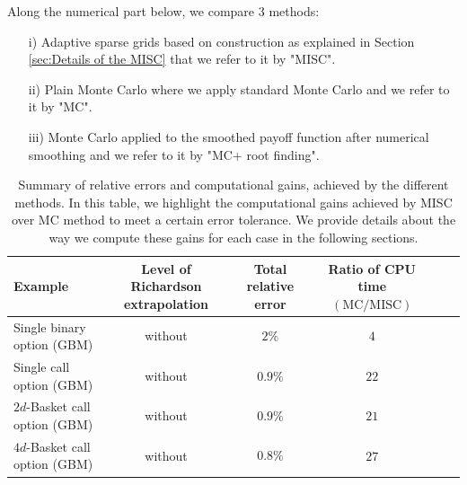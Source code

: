 Along the numerical part below, we compare $3$ methods:
\begin{enumerate}
\item[i)] Adaptive sparse grids based on construction as explained in Section \ref{sec:Details of the MISC} that we refer to it by "MISC".
\item[ii)] Plain Monte Carlo where we apply standard Monte Carlo and we refer to it by "MC".
\item[iii)] Monte Carlo applied to the smoothed payoff function after numerical smoothing and we refer to it by "MC+ root finding".
\end{enumerate}
\FloatBarrier
\begin{table}[!h]
	\centering
	\begin{small}
	\begin{tabular}{l*{4}{c}r}
	\toprule[1.5pt]
		Example          & Level of Richardson extrapolation    &  Total relative error  & Ratio of CPU time  $\left(\text{MC}/ \text{MISC} \right)$ \\
		\hline
			  Single binary option (GBM) & without  &  $2 \%$&  $ 4$ \\	
              \hline
            Single call option (GBM)  & without    &  $0.9\%$&  $22$ \\
				 \hline
					$2d$-Basket call option (GBM)  & without    &  $$0.9\%$$&  $21$ \\	
					\hline
					$4d$-Basket call option (GBM)  & without    &  $$0.8\%$$&  $27$ \\	
		\bottomrule[1.25pt]
	\end{tabular}
\end{small}
	\caption{Summary of relative errors and computational gains, achieved by the different methods. In this table, we highlight the computational gains achieved by MISC over MC method to meet a certain error tolerance. We provide details about the way we compute these gains for each case in the following sections.}
	\label{table:Summary of our numerical results.}
\end{table}
\FloatBarrier


